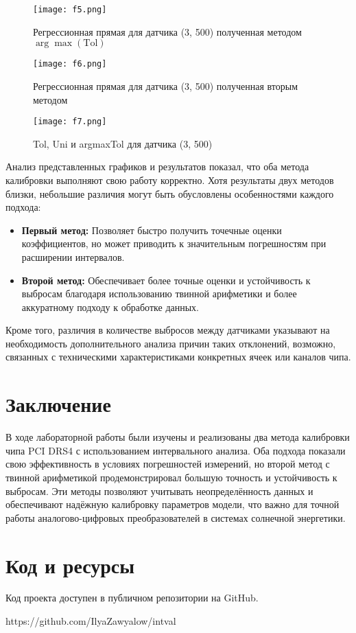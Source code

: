 \documentclass[a4paper,14pt]{extarticle}
\begin{document}
\begin{figure}[htbp]
    \centering
    \texttt{[image: f5.png]}
    \caption{Регрессионная прямая для датчика (3, 500) полученная методом $\arg\max(\text{Tol})$}
    \label{fig:hamiltonianGraph}
\end{figure}
\clearpage
\begin{figure}[htbp]
    \centering
    \texttt{[image: f6.png]}
    \caption{Регрессионная прямая для датчика (3, 500) полученная вторым методом}
    \label{fig:hamiltonianGraph}
\end{figure}

\begin{figure}[htbp]
    \centering
    \texttt{[image: f7.png]}
    \caption{Tol, Uni и argmaxTol для датчика (3, 500)}
    \label{fig:hamiltonianGraph}
\end{figure}
\clearpage
Анализ представленных графиков и результатов показал, что оба метода калибровки выполняют свою работу корректно. Хотя результаты двух методов близки, небольшие различия могут быть обусловлены особенностями каждого подхода:
\begin{itemize}
    \item \textbf{Первый метод:} Позволяет быстро получить точечные оценки коэффициентов, но может приводить к значительным погрешностям при расширении интервалов.
    \item \textbf{Второй метод:} Обеспечивает более точные оценки и устойчивость к выбросам благодаря использованию твинной арифметики и более аккуратному подходу к обработке данных.
\end{itemize}
Кроме того, различия в количестве выбросов между датчиками указывают на необходимость дополнительного анализа причин таких отклонений, возможно, связанных с техническими характеристиками конкретных ячеек или каналов чипа.

\section{Заключение}
В ходе лабораторной работы были изучены и реализованы два метода калибровки чипа PCI DRS4 с использованием интервального анализа. Оба подхода показали свою эффективность в условиях погрешностей измерений, но второй метод с твинной арифметикой продемонстрировал большую точность и устойчивость к выбросам. Эти методы позволяют учитывать неопределённость данных и обеспечивают надёжную калибровку параметров модели, что важно для точной работы аналогово-цифровых преобразователей в системах солнечной энергетики.


\section{Код и ресурсы}
Код проекта доступен в публичном репозитории на GitHub.

https://github.com/IlyaZawyalow/intval
\end{document}
